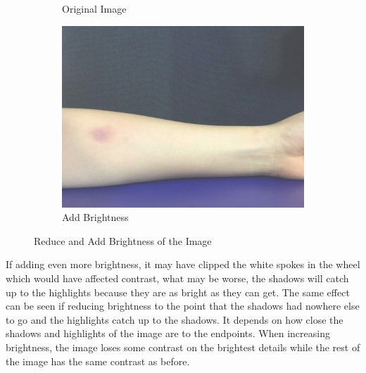 \begin{figure}[!h]
\begin{subfigure}{.3\textwidth}
  \caption{Original Image}
  \label{fig:sub2}
\end{subfigure}
\begin{subfigure}{.3\textwidth}
  \centering
  \includegraphics[scale=0.14]{img/bright2}
  \caption{Add Brightness}
  \label{fig:sub2}
\end{subfigure}
\caption{Reduce and Add Brightness of the Image}
\label{fig:test}
\end{figure}

If adding even more brightness, it may have clipped the white spokes in the wheel which would have affected contrast, what may be worse, the shadows will catch up to the highlights because they are as bright as they can get. The same effect can be seen if reducing brightness to the point that the shadows had nowhere else to go and the highlights catch up to the shadows. It depends on how close the shadows and highlights of the image are to the endpoints. When increasing brightness, the image loses some contrast on the brightest details while the rest of the image has the same contrast as before.\\

